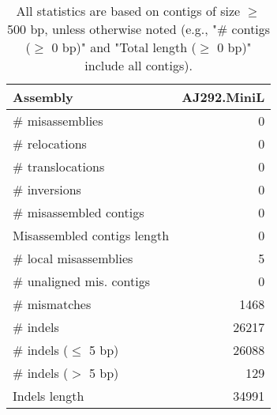 \documentclass[12pt,a4paper]{article}
\begin{document}
\begin{table}[ht]
\begin{center}
\caption{All statistics are based on contigs of size $\geq$ 500 bp, unless otherwise noted (e.g., "\# contigs ($\geq$ 0 bp)" and "Total length ($\geq$ 0 bp)" include all contigs).}
\begin{tabular}{|l*{1}{|r}|}
\hline
Assembly & AJ292.MiniL \\ \hline
\# misassemblies & 0 \\ \hline
\hspace{5mm}\# relocations & 0 \\ \hline
\hspace{5mm}\# translocations & 0 \\ \hline
\hspace{5mm}\# inversions & 0 \\ \hline
\# misassembled contigs & 0 \\ \hline
Misassembled contigs length & 0 \\ \hline
\# local misassemblies & 5 \\ \hline
\# unaligned mis. contigs & 0 \\ \hline
\# mismatches & 1468 \\ \hline
\# indels & 26217 \\ \hline
\hspace{5mm}\# indels ($\leq$ 5 bp) & 26088 \\ \hline
\hspace{5mm}\# indels ($>$ 5 bp) & 129 \\ \hline
Indels length & 34991 \\ \hline
\end{tabular}
\end{center}
\end{table}
\end{document}
